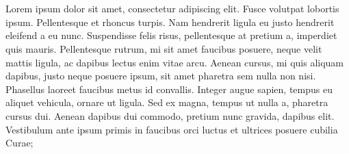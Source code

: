 \chapter*{}

Lorem ipsum dolor sit amet, consectetur adipiscing elit. Fusce volutpat lobortis ipsum. Pellentesque et rhoncus turpis. Nam hendrerit ligula eu justo hendrerit eleifend a eu nunc. Suspendisse felis risus, pellentesque at pretium a, imperdiet quis mauris. Pellentesque rutrum, mi sit amet faucibus posuere, neque velit mattis ligula, ac dapibus lectus enim vitae arcu. Aenean cursus, mi quis aliquam dapibus, justo neque posuere ipsum, sit amet pharetra sem nulla non nisi. Phasellus laoreet faucibus metus id convallis. Integer augue sapien, tempus eu aliquet vehicula, ornare ut ligula. Sed ex magna, tempus ut nulla a, pharetra cursus dui. Aenean dapibus dui commodo, pretium nunc gravida, dapibus elit. Vestibulum ante ipsum primis in faucibus orci luctus et ultrices posuere cubilia Curae;